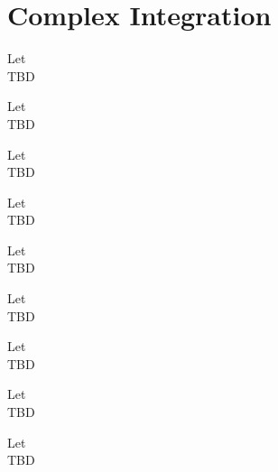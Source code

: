 \section{Complex Integration}


\begin{theorem}
    \label{sec:ClosedContourT}
    Let \\
    TBD
\end{theorem}


\begin{theorem}
    \label{sec:MainTCalculus}
    Let \\
    TBD
\end{theorem}


\begin{theorem}
    \label{sec:CauchyITT}
    Let \\
    TBD
\end{theorem}


\begin{theorem}
    \label{sec:CauchyITR}
    Let \\
    TBD
\end{theorem}


\begin{theorem}
    \label{sec:CauchyIF}
    Let \\
    TBD
\end{theorem}


\begin{theorem}
    \label{sec:GCauchyIF}
    Let \\
    TBD
\end{theorem}


\begin{theorem}
    \label{sec:MoreraT}
    Let \\
    TBD
\end{theorem}


\begin{theorem}
    \label{sec:LiouvilleT}
    Let \\
    TBD
\end{theorem}


\begin{theorem}
    \label{sec:FTAlgebra}
    Let \\
    TBD
\end{theorem}